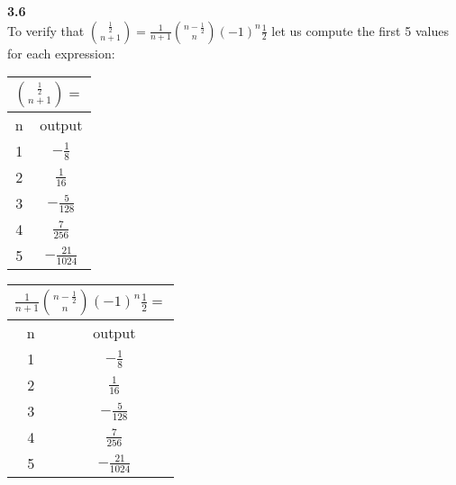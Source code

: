 \documentclass[10pt,a4paper]{report}
\begin{document}
	\textbf{3.6}\\
	To verify that $\binom{\frac{1}{2}}{n+1} = \frac{1}{n+1}\binom{n-\frac{1}{2}}{n}(-1)^n\frac{1}{2}$ let us compute the first 5 values for each expression:\\
	\begin{center}
		\begin{tabular}{|c|c|}
			\hline
			\multicolumn{2}{|c|}{$\binom{\frac{1}{2}}{n+1} = $} \\[.25cm]
			\hline
			n&output\\
			\hline
			1&$-\frac{1}{8}$\\[.25cm]
			\hline
			2&$\frac{1}{16}$\\[.25cm]
			\hline
			3&$-\frac{5}{128}$\\[.25cm]
			\hline
			4&$\frac{7}{256}$\\[.25cm]
			\hline
			5&$-\frac{21}{1024}$\\[.25cm]
			\hline
		\end{tabular}
		\hspace{2em}
		\begin{tabular}{|c|c|}
			\hline
			\multicolumn{2}{|c|}{$\frac{1}{n+1}\binom{n-\frac{1}{2}}{n}(-1)^n\frac{1}{2} = $} \\[.25cm]
			\hline
			n&output\\
			\hline
			1&$-\frac{1}{8}$\\[.25cm]
			\hline
			2&$\frac{1}{16}$\\[.25cm]
			\hline
			3&$-\frac{5}{128}$\\[.25cm]
			\hline
			4&$\frac{7}{256}$\\[.25cm]
			\hline
			5&$-\frac{21}{1024}$\\[.25cm]
			\hline
		\end{tabular}
	\end{center}
	
\end{document}
